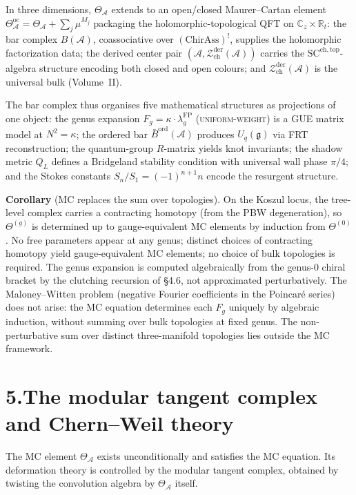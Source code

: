 \documentclass[11pt,reqno]{amsart}
\theoremstyle{definition}
\theoremstyle{remark}
\providecommand{\cA}{\mathcal{A}}
\providecommand{\cZ}{\mathcal{Z}}
\providecommand{\barB}{\bar{B}}
\providecommand{\SCchtop}{\mathrm{SC}^{\mathrm{ch,top}}}
\numberwithin{equation}{section}
\begin{document}
In three dimensions, $\Theta_\cA$ extends to an open/closed
Maurer--Cartan element
$\Theta^{\mathrm{oc}}_\cA=\Theta_\cA+\sum_j\mu^{M_j}$
packaging the holomorphic-topological QFT on
$\mathbb C_z\times\mathbb R_t$: the bar complex $B(\cA)$, coassociative over $(\mathrm{ChirAss})^!$,
supplies the holomorphic factorization data; the derived center pair
$(\cA, \cZ^{\mathrm{der}}_{\mathrm{ch}}(\cA))$ carries the
$\SCchtop$-algebra structure encoding both closed and open colours;
and $\cZ^{\mathrm{der}}_{\mathrm{ch}}(\cA)$ is the universal bulk
(Volume~II).

The bar complex thus organises five mathematical structures as
projections of one object: the genus expansion
$F_g=\kappa\cdot\lambda_g^{\mathrm{FP}}$ \textsc{(uniform-weight)} is
a GUE matrix model at $N^2=\kappa$; the ordered bar
$\barB^{\mathrm{ord}}(\cA)$ produces $U_q(\mathfrak g)$ via FRT
reconstruction; the quantum-group $R$-matrix yields knot invariants;
the shadow metric $Q_L$ defines a Bridgeland stability condition with
universal wall phase $\pi/4$; and the Stokes constants
$S_n/S_1=(-1)^{n+1}n$ encode the resurgent structure.

\medskip
\noindent\textbf{Corollary} (MC replaces the sum over topologies).
On the Koszul locus, the tree-level complex carries a contracting
homotopy (from the PBW degeneration), so $\Theta^{(g)}$ is determined
up to gauge-equivalent MC elements by induction from $\Theta^{(0)}$.
No free parameters appear at any genus; distinct choices of
contracting homotopy yield gauge-equivalent MC elements; no choice of
bulk topologies is required. The genus expansion is computed
algebraically from the genus-$0$ chiral bracket by the clutching
recursion of \S4.6, not approximated perturbatively. The
Maloney--Witten problem (negative Fourier coefficients in the
Poincar\'e series) does not arise: the MC equation determines each
$F_g$ uniquely by algebraic induction, without summing over bulk
topologies at fixed genus. The non-perturbative sum over distinct
three-manifold topologies lies outside the MC framework.


\section*{5.\quad The modular tangent complex and Chern--Weil theory}

The MC element $\Theta_\cA$ exists unconditionally and satisfies the
MC equation. Its deformation theory is controlled by the modular
tangent complex, obtained by twisting the convolution algebra by
$\Theta_\cA$ itself.
\end{document}
